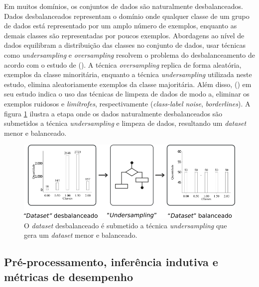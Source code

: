 Em muitos domínios, os conjuntos de dados são naturalmente desbalanceados. 
Dados desbalanceados representam o domínio onde qualquer classe de um grupo 
de dados está representado por um amplo número de exemplos, enquanto as demais 
classes são representadas por poucos exemplos. Abordagens ao nível de dados 
equilibram a distribuição das classes no conjunto de dados, usar técnicas como 
\textit{undersampling} e \textit{oversampling} resolvem o problema do 
desbalanceamento de acordo com o estudo de  
(\citeyear{ferreiraestudo}). A técnica \textit{oversampling} replica de forma 
aleatória, exemplos da classe minoritária, enquanto a técnica 
\textit{undersampling} utilizada neste estudo, elimina aleatoriamente exemplos 
da classe majoritária. Além disso,  
(\citeyear{machado2009estudo}) em seu estudo indica o uso das técnicas de 
limpeza de dados de modo a, eliminar os exemplos ruidosos e \textit{limítrofes}, 
respectivamente (\textit{class-label noise}, \textit{borderlines}). A figura 
\ref{figure:metodologia_2} ilustra a etapa onde os dados naturalmente 
desbalanceados são submetidos a técnica \textit{undersampling} e limpeza de 
dados, resultando um \textit{dataset} menor e balanceado.

\begin{figure}[H]
\begin{center}
    \includegraphics[scale=0.60]{images/metodologia_2.png}
\end{center}
\caption{O \textit{dataset} desbalanceado é submetido a técnica
\textit{undersampling} que gera um \textit{dataset} menor e balanceado.}
\label{figure:metodologia_2}
\end{figure}

\newpage
\subsection{Pré-processamento, inferência indutiva e métricas de desempenho}
\label{subsection:pre_processamento}

